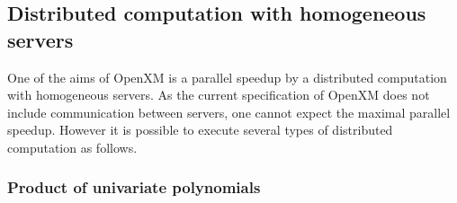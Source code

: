 
\subsection{Distributed computation with homogeneous servers}
\label{section:homog}

One of the aims of OpenXM is a parallel speedup by a distributed computation
with homogeneous servers. As the current specification of OpenXM does
not include communication between servers, one cannot expect
the maximal parallel speedup. However it is possible to execute
several types of distributed computation as follows.

\subsubsection{Product of univariate polynomials}

